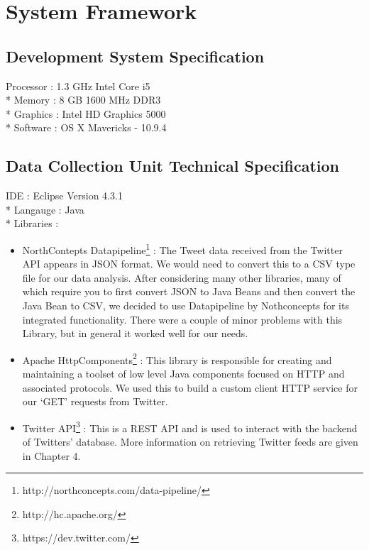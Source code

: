 \section{System Framework}
\subsection{Development System Specification}
Processor : 1.3 GHz Intel Core i5\\*
Memory : 8 GB 1600 MHz DDR3\\*
Graphics : Intel HD Graphics 5000\\*
Software : OS X Mavericks - 10.9.4

\subsection{Data Collection Unit Technical Specification}
IDE : Eclipse Version 4.3.1 \\*
Langauge : Java \\*
Libraries :
\begin{itemize}
\item NorthContepts Datapipeline\footnote{http://northconcepts.com/data-pipeline/} : The Tweet data received from the Twitter API appears in JSON format. We would need to convert this to a CSV type file for our data analysis. After considering many other libraries, many of which require you to first convert JSON to Java Beans and then convert the Java Bean to CSV,  we decided to use Datapipeline by Nothconcepts for its integrated functionality. There were a couple of minor problems with this Library, but in general it worked well for our needs. 
\item Apache HttpComponents\footnote{http://hc.apache.org/} : This library is responsible for creating and maintaining a toolset of low level Java components focused on HTTP and associated protocols. We used this to build a custom client HTTP service for our `GET' requests from Twitter. 
\item Twitter API\footnote{https://dev.twitter.com/} : This is a REST API and is used to interact with the backend of Twitters' database. More information on retrieving Twitter feeds are given in Chapter 4. 
\end{itemize}

